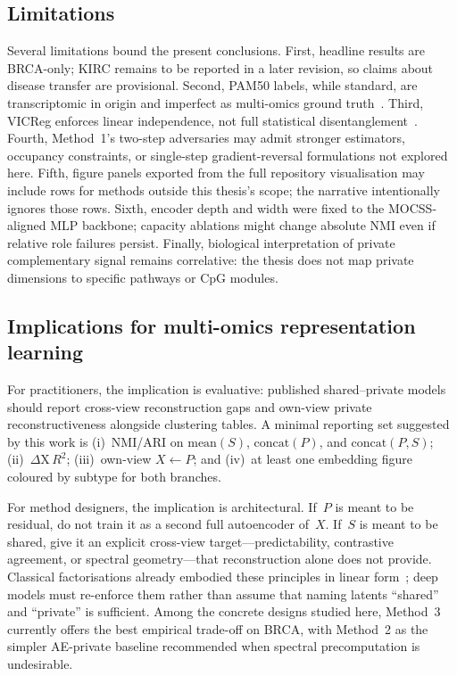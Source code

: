 \subsection{Limitations}

Several limitations bound the present conclusions. First, headline results are BRCA-only; KIRC remains to be reported in a later revision, so claims about disease transfer are provisional. Second, PAM50 labels, while standard, are transcriptomic in origin and imperfect as multi-omics ground truth~\citep{parker2009pam50,cantini2021benchmarking}. Third, VICReg enforces linear independence, not full statistical disentanglement~\citep{martens2024disentangling,zbontar2021barlow}. Fourth, Method~1's two-step adversaries may admit stronger estimators, occupancy constraints, or single-step gradient-reversal formulations not explored here. Fifth, figure panels exported from the full repository visualisation may include rows for methods outside this thesis's scope; the narrative intentionally ignores those rows. Sixth, encoder depth and width were fixed to the MOCSS-aligned MLP backbone; capacity ablations might change absolute NMI even if relative role failures persist. Finally, biological interpretation of private complementary signal remains correlative: the thesis does not map private dimensions to specific pathways or CpG modules.

\subsection{Implications for multi-omics representation learning}

For practitioners, the implication is evaluative: published shared--private models should report cross-view reconstruction gaps and own-view private reconstructiveness alongside clustering tables. A minimal reporting set suggested by this work is (i)~NMI/ARI on $\mathrm{mean}(S)$, $\mathrm{concat}(P)$, and $\mathrm{concat}(P,S)$; (ii)~$\Delta\mathrm{X}\,R^{2}$; (iii)~own-view $X\leftarrow P$; and (iv)~at least one embedding figure coloured by subtype for both branches.

For method designers, the implication is architectural. If~$P$ is meant to be residual, do not train it as a second full autoencoder of~$X$. If~$S$ is meant to be shared, give it an explicit cross-view target---predictability, contrastive agreement, or spectral geometry---that reconstruction alone does not provide. Classical factorisations already embodied these principles in linear form~\citep{lock2013jive,shen2009integrative,argelaguet2018multi}; deep models must re-enforce them rather than assume that naming latents ``shared'' and ``private'' is sufficient. Among the concrete designs studied here, Method~3 currently offers the best empirical trade-off on BRCA, with Method~2 as the simpler AE-private baseline recommended when spectral precomputation is undesirable.
